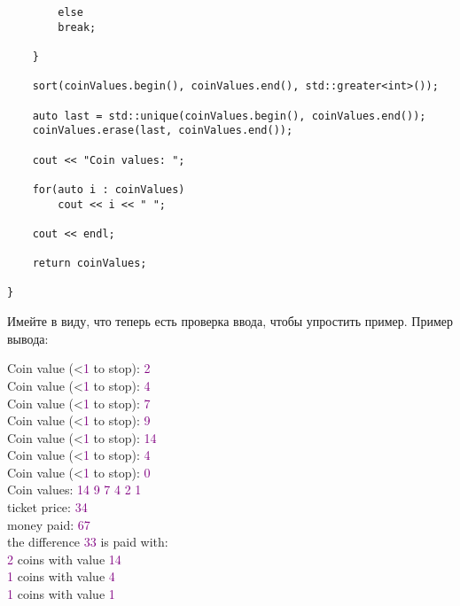 \begin{tcolorbox}
\begin{verbatim}
		else
		break;
	
	}
	
	sort(coinValues.begin(), coinValues.end(), std::greater<int>());
	
	auto last = std::unique(coinValues.begin(), coinValues.end());
	coinValues.erase(last, coinValues.end());
	
	cout << "Coin values: ";
	
	for(auto i : coinValues)
		cout << i << " ";
	
	cout << endl;
	
	return coinValues;

}
\end{verbatim}
\end{tcolorbox}

Имейте в виду, что теперь есть проверка ввода, чтобы упростить пример. Пример вывода:

\vspace{\baselineskip}

\begin{tcolorbox}
{
Coin value (<\textcolor{Purple}{1} to stop): \textcolor{Purple}{2} \\
Coin value (<\textcolor{Purple}{1} to stop): \textcolor{Purple}{4} \\
Coin value (<\textcolor{Purple}{1} to stop): \textcolor{Purple}{7} \\
Coin value (<\textcolor{Purple}{1} to stop): \textcolor{Purple}{9} \\
Coin value (<\textcolor{Purple}{1} to stop): \textcolor{Purple}{14} \\
Coin value (<\textcolor{Purple}{1} to stop): \textcolor{Purple}{4} \\
Coin value (<\textcolor{Purple}{1} to stop): \textcolor{Purple}{0} \\
Coin values: \textcolor{Purple}{14 9 7 4 2 1} \\
ticket price: \textcolor{Purple}{34} \\
money paid: \textcolor{Purple}{67} \\
the difference \textcolor{Purple}{33} is paid with: \\
\textcolor{Purple}{2} coins with value \textcolor{Purple}{14} \\
\textcolor{Purple}{1} coins with value \textcolor{Purple}{4} \\
\textcolor{Purple}{1} coins with value \textcolor{Purple}{1}}
\end{tcolorbox}

\vspace{\baselineskip}

